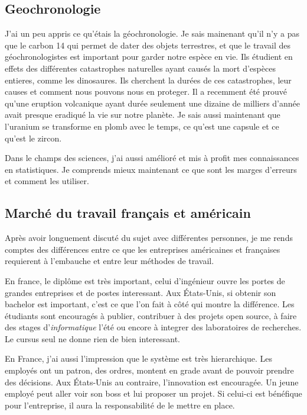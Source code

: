 \subsection{Geochronologie}
J'ai un peu appris ce qu'étais la géochronologie. Je sais mainenant qu'il n'y a pas que le carbon 14 qui permet de dater des objets terrestres, et que le travail des géochronologistes est important pour garder notre espèce en vie. Ils étudient en effets des différentes catastrophes naturelles ayant causés la mort d'espèces entieres, comme les dinosaures. Ils cherchent la durées de ces catastrophes, leur causes et comment nous pouvons nous en proteger. Il a recemment été prouvé qu'une eruption volcanique ayant durée seulement une dizaine de milliers d'année avait presque eradiqué la vie sur notre planète.
Je sais aussi maintenant que l'uranium se transforme en plomb avec le temps, ce qu'est une capsule et ce qu'est le zircon.

Dans le champs des sciences, j'ai aussi amélioré et mis à profit mes connaissances en statistiques. Je comprends mieux maintenant ce que sont les marges d'erreurs et comment les utiliser.

\subsection{Marché du travail français et américain}
Après avoir longuement discuté du sujet avec différentes personnes, je me rends comptes des différences entre ce que les entreprises américaines et françaises requierent à l'embauche et entre leur méthodes de travail. 

En france, le diplôme est très important, celui d'ingénieur ouvre les portes de grandes entreprises et de postes interessant. Aux États-Unis, si obtenir son bachelor est important, c'est ce que l'on fait à côté qui montre la différence. Les étudiants sont encouragés à publier, contribuer à des projets open source, à faire des stages d'\emph{informatique} l'été ou encore à integrer des laboratoires de recherches. Le cursus seul ne donne rien de bien interessant.

En France, j'ai aussi l'impression que le système est très hierarchique. Les employés ont un patron, des ordres, montent en grade avant de pouvoir prendre des décisions. Aux États-Unis au contraire, l'innovation est encouragée. Un jeune employé peut aller voir son boss et lui proposer un projet. Si celui-ci est bénéfique pour l'entreprise, il aura la responsabilité de le mettre en place. 

